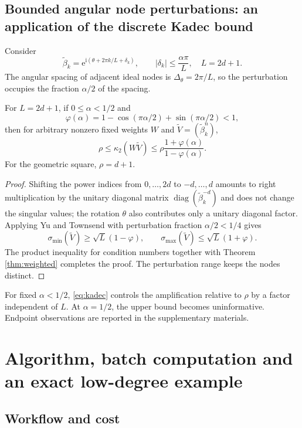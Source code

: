 \documentclass[10pt,twoside,final]{siamart1116}
\numberwithin{equation}{section}
\numberwithin{theorem}{section}
\newcommand{\diag}{\operatorname{diag}}
\newcommand{\cond}{\kappa_2}
\newcommand{\e}{\mathrm e}
\newcommand{\ii}{\mathrm i}
\begin{document}
\subsection{Bounded angular node perturbations: an application of the discrete Kadec bound}

Consider
\[
\widetilde\beta_k=\e^{\ii(\theta+2\pi k/L+\delta_k)},\qquad
|\delta_k|\le\frac{\alpha\pi}{L},\quad L=2d+1.
\]
The angular spacing of adjacent ideal nodes is $\Delta_\theta=2\pi/L$, so the perturbation occupies
the fraction $\alpha/2$ of the spacing.

\begin{corollary}\label{cor:kadec}
For $L=2d+1$, if $0\le\alpha<1/2$ and
\[
\varphi(\alpha)=1-\cos(\pi\alpha/2)+\sin(\pi\alpha/2)<1,
\]
then for arbitrary nonzero fixed weights $W$ and $\widetilde V=(\widetilde\beta_k^n)$,
\begin{equation}\label{eq:kadec}
\rho\le\cond(W\widetilde V)
\le\rho\frac{1+\varphi(\alpha)}{1-\varphi(\alpha)}.
\end{equation}
For the geometric square, $\rho=d+1$.
\end{corollary}
\begin{proof}
Shifting the power indices from $0,\ldots,2d$ to $-d,\ldots,d$ amounts to right
multiplication by the unitary diagonal matrix $\diag(\widetilde\beta_k^{-d})$ and does
not change the singular values; the rotation $\theta$ also contributes only a unitary
diagonal factor. Applying Yu and Townsend \cite[Theorem 2.1, Corollary 2.3]{yu} with
perturbation fraction $\alpha/2<1/4$ gives
\[
\sigma_{\min}(\widetilde V)\ge\sqrt L(1-\varphi),\qquad
\sigma_{\max}(\widetilde V)\le\sqrt L(1+\varphi).
\]
The product inequality for condition numbers together with Theorem \ref{thm:weighted}
completes the proof. The perturbation range keeps the nodes distinct.
\end{proof}

For fixed $\alpha<1/2$, \eqref{eq:kadec} controls the amplification relative to $\rho$
by a factor independent of $L$. At $\alpha=1/2$, the upper bound becomes
uninformative. Endpoint observations are reported in the supplementary materials.

\section{Algorithm, batch computation and an exact low-degree example}
\label{sec:algorithm}

\subsection{Workflow and cost}
\end{document}
